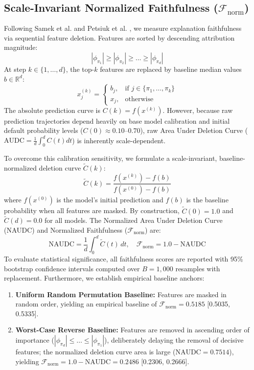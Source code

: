 \documentclass[conference]{IEEEtran}
\begin{document}
\subsection{Scale-Invariant Normalized Faithfulness ($\mathcal{F}_{\text{norm}}$)}
Following Samek et al. \cite{samek2017evaluating} and Petsiuk et al. \cite{petsiuk2018rise}, we measure explanation faithfulness via sequential feature deletion. Features are sorted by descending attribution magnitude:
\begin{equation}
|\phi_{\pi_1}| \ge |\phi_{\pi_2}| \ge \dots \ge |\phi_{\pi_d}|
\end{equation}
At step $k \in \{1, \dots, d\}$, the top-$k$ features are replaced by baseline median values $b \in \mathbb{R}^d$:
\begin{equation}
x^{(k)}_j = 
\begin{cases}
b_j, & \text{if } j \in \{\pi_1, \dots, \pi_k\} \\
x_j, & \text{otherwise}
\end{cases}
\end{equation}
The absolute prediction curve is $C(k) = f(x^{(k)})$. However, because raw prediction trajectories depend heavily on base model calibration and initial default probability levels ($C(0) \approx 0.10$--$0.70$), raw Area Under Deletion Curve ($\text{AUDC} = \frac{1}{d}\int_0^d C(t)dt$) is inherently scale-dependent. 

To overcome this calibration sensitivity, we formulate a scale-invariant, baseline-normalized deletion curve $\tilde{C}(k)$:
\begin{equation}
\tilde{C}(k) = \frac{f(x^{(k)}) - f(b)}{f(x^{(0)}) - f(b)}
\end{equation}
where $f(x^{(0)})$ is the model's initial prediction and $f(b)$ is the baseline probability when all features are masked. By construction, $\tilde{C}(0) = 1.0$ and $\tilde{C}(d) = 0.0$ for all models. The Normalized Area Under Deletion Curve (NAUDC) and Normalized Faithfulness ($\mathcal{F}_{\text{norm}}$) are:
\begin{equation}
\text{NAUDC} = \frac{1}{d} \int_{0}^{d} \tilde{C}(t) \, dt, \quad \mathcal{F}_{\text{norm}} = 1.0 - \text{NAUDC}
\end{equation}
To evaluate statistical significance, all faithfulness scores are reported with 95\% bootstrap confidence intervals computed over $B = 1,000$ resamples with replacement. Furthermore, we establish empirical baseline anchors:
\begin{enumerate}
    \item \textbf{Uniform Random Permutation Baseline:} Features are masked in random order, yielding an empirical baseline of $\mathcal{F}_{\text{norm}} = 0.5185$ [0.5035, 0.5335].
    \item \textbf{Worst-Case Reverse Baseline:} Features are removed in ascending order of importance ($|\phi_{\pi_d}| \le \dots \le |\phi_{\pi_1}|$), deliberately delaying the removal of decisive features; the normalized deletion curve area is large ($\text{NAUDC} = 0.7514$), yielding $\mathcal{F}_{\text{norm}} = 1.0 - \text{NAUDC} = \mathbf{0.2486}$ [0.2306, 0.2666].
\end{enumerate}
\end{document}
